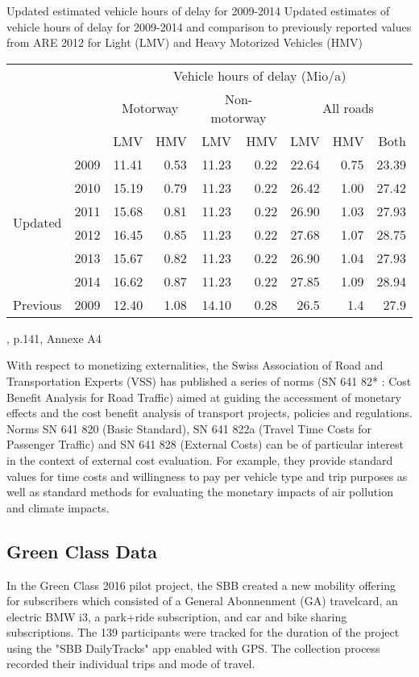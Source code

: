 \createtable%
{Updated estimated vehicle hours of delay for 2009-2014}%
{Updated estimates of vehicle hours of delay for 2009-2014 and comparison to previously reported values from ARE 2012 for Light (LMV) and Heavy Motorized Vehicles (HMV)}%
{\label{tab:vehHoursDelayMkInfras}}%
{%
  \begin{tabular}[c]{lrrrrrrrr}
    \toprule
    \multirow{3}{*}{} & & \multicolumn{7}{c}{Vehicle hours of delay (Mio/a)}\\ 
    & & \multicolumn{2}{c}{Motorway} & \multicolumn{2}{c}{Non-motorway} & \multicolumn{3}{c}{All roads}\\
    & &  LMV & HMV & LMV & HMV & LMV & HMV & Both\\
    \midrule
    \multirow{6}{*}{Updated}
    & 2009 & 11.41 & 0.53 & 11.23 & 0.22 & 22.64 & 0.75 & 23.39 \\
    & 2010 & 15.19 & 0.79 & 11.23 & 0.22 & 26.42 & 1.00 & 27.42 \\
    & 2011 & 15.68 & 0.81 & 11.23 & 0.22 & 26.90 & 1.03 & 27.93 \\
    & 2012 & 16.45 & 0.85 & 11.23 & 0.22 & 27.68 & 1.07 & 28.75 \\
    & 2013 & 15.67 & 0.82 & 11.23 & 0.22 & 26.90 & 1.04 & 27.93 \\
    & 2014 & 16.62 & 0.87 & 11.23 & 0.22 & 27.85 & 1.09 & 28.94 \\
    \midrule
    Previous & 2009 & 12.40 & 1.08 & 14.10 & 0.28 & 26.5 & 1.4 & 27.9 \\
    \bottomrule
  \end{tabular}
}%
{\citet{mkinfras2016staukosten}, p.141, Annexe A4}

With respect to monetizing externalities, the Swiss Association of Road and Transportation Experts (VSS) has published a series of norms (SN 641 82* : Cost Benefit Analysis for Road Traffic) aimed at guiding the accessment of monetary effects and the cost benefit analysis of transport projects, policies and regulations.
Norms SN 641 820 (Basic Standard), SN 641 822a (Travel Time Costs for Passenger Traffic) and SN 641 828 (External Costs) can be of particular interest in the context of external cost evaluation.
For example, they provide standard values for time costs and willingness to pay per vehicle type and trip purposes as well as standard methods for evaluating the monetary impacts of air pollution and climate impacts.
 

\subsection{Green Class Data}
In the Green Class 2016 pilot project, the SBB created a new mobility offering for subscribers which consisted of a General Abonnenment (GA) travelcard, an electric BMW i3, a park+ride subscription, and car and bike sharing subscriptions.
The 139 participants were tracked for the duration of the project using the "SBB DailyTracks" app enabled with GPS.
The collection process recorded their individual trips and mode of travel.

